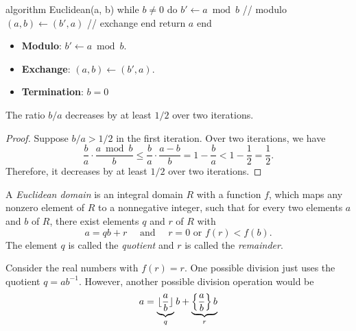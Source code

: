 \begin{Pseudocode}
algorithm Euclidean(a, b)
  while $b ≠ 0$ do
    $b' ← a \bmod b$ // modulo
    $(a, b) ← (b', a)$ // exchange
  end
  return $a$
end
\end{Pseudocode}

\begin{itemize}
  \item \textbf{Modulo}: $b' ← a \bmod b$.
  \item \textbf{Exchange}: $(a, b) ← (b', a)$.
  \item \textbf{Termination}: $b = 0$
\end{itemize}

\begin{proposition}
  The ratio $b/a$ decreases by at least $1/2$ over two iterations.
\end{proposition}

\begin{proof}
  Suppose $b/a > 1/2$ in the first iteration.
  Over two iterations, we have
  \[
    \frac{b}{a} · \frac{a \bmod b}{b}
    ≤ \frac{b}{a} · \frac{a - b}{b}
    = 1 - \frac{b}{a}
    < 1 - \frac{1}{2}
    = \frac{1}{2}.
  \]
  Therefore, it decreases by at least $1/2$ over two iterations.
\end{proof}

\begin{definition}
  A \emph{Euclidean domain} is an integral domain $R$ with a function $f$,
  which maps any nonzero element of $R$ to a nonnegative integer,
  such that for every two elements $a$ and $b$ of $R$, there exist elements $q$ and $r$ of $R$ with
  \[
    a = qb + r \quad \text{ and } \quad r = 0 \text{ or } f(r) < f(b).
  \]
  The element $q$ is called the \emph{quotient} and $r$ is called the \emph{remainder}.
\end{definition}

\begin{example}
  Consider the real numbers with $f(r) = r$.
  One possible division just uses the quotient $q = ab^{-1}$.
  However,
  another possible division operation would be
  \[
    a = \underbrace{\lfloor\frac{a}{b}\rfloor}_q b + \underbrace{\left\{ \frac{a}{b} \right\} b}_r
  \]
\end{example}

\begin{example}
\end{example}


